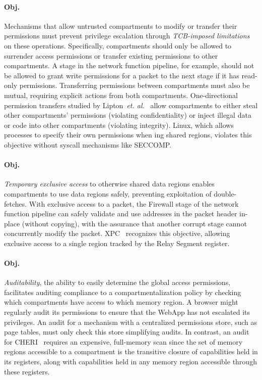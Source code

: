 \paragraph{Obj. }
Mechanisms that allow untrusted compartments to modify or transfer their 
permissions must prevent privilege escalation %
through \emph{TCB-imposed limitations} on these operations.
Specifically, compartments should only be allowed to surrender access 
permissions or transfer existing permissions to other compartments.
A stage in the network function pipeline, for example, should not be allowed
to grant write permissions for a packet to the next stage if it has
read-only permissions.
Transferring permissions between compartments must also be mutual, requiring
explicit actions from both compartments.
One-directional permission transfers studied by 
Lipton~\textit{et. al.}~\cite{LiptonS77} 
allow compartments to either steal other compartments'
permissions (violating confidentiality) or
inject illegal data or code into other compartments (violating integrity).
Linux, which allows processes to specify their own permissions
when ing shared regions, violates this objective without 
syscall mechanisms like SECCOMP.

\paragraph{Obj. } 
\emph{Temporary exclusive access} to otherwise 
shared data regions enables compartments to use data regions safely,
preventing exploitation of double-fetches.
With exclusive access to a packet, the Firewall stage of the network function
pipeline can safely validate and use addresses in the packet header in-place 
(without copying), with the assurance that another corrupt stage cannot
concurrently modify the packet.
XPC~\cite{DuHXZC19XPC} recognizes this objective, allowing exclusive access
to a single region tracked by the Relay Segment register.

\paragraph{Obj. } 
\emph{Auditability}, the ability to easily determine the 
global access permissions, facilitates auditing compliance to a 
compartmentalization policy by checking which compartments have access to
which memory region.
A browser might regularly audit its permissions to ensure that the WebApp
has not escalated its privileges.
An audit for a mechanism with a centralized permissions store, 
such as page tables, must only check this store simplifying audits.
In contrast, an audit for CHERI~\cite{WatsonWNMACDDGL15} requires an 
expensive, full-memory scan since the set of memory regions accessible to a
compartment is the transitive closure of capabilities held in its registers,
along with capabilities held in any memory region accessible through these 
registers.


